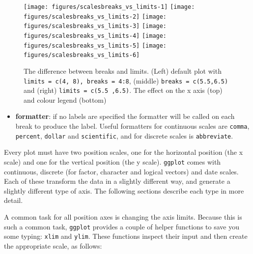 \begin{figure}

{\centering \texttt{[image: figures/scalesbreaks\_vs\_limits-1]} \texttt{[image: figures/scalesbreaks\_vs\_limits-2]} \texttt{[image: figures/scalesbreaks\_vs\_limits-3]} \texttt{[image: figures/scalesbreaks\_vs\_limits-4]} \texttt{[image: figures/scalesbreaks\_vs\_limits-5]} \texttt{[image: figures/scalesbreaks\_vs\_limits-6]} 

}

\caption{The difference between breaks and limits. (Left) default plot with \texttt{limits = c(4, 8), breaks = 4:8}, (middle) \texttt{breaks = c(5.5,6.5)} and (right) \texttt{limits = c(5.5 ,6.5)}. The effect on the x axis (top) and colour legend (bottom)\label{fig:breaks_vs_limits}}
\end{figure}

\begin{itemize}
\itemsep1pt\parskip0pt
\item
  \textbf{formatter}: if no labels are specified the formatter will be
  called on each break to produce the label. Useful formatters for
  continuous scales are \texttt{comma}, \texttt{percent},
  \texttt{dollar} and \texttt{scientific}, and for discrete scales is
  \texttt{abbreviate}. 
\end{itemize}


Every plot must have two position scales, one for the horizontal
position (the x scale) and one for the vertical position (the y scale).
\texttt{ggplot} comes with continuous, discrete (for factor, character
and logical vectors) and date scales. Each of these transform the data
in a slightly different way, and generate a slightly different type of
axis. The following sections describe each type in more detail.
 

A common task for all position axes is changing the axis limits. Because
this is such a common task, \texttt{ggplot} provides a couple of helper
functions to save you some typing: \texttt{xlim} and \texttt{ylim}.
These functions inspect their input and then create the appropriate
scale, as follows:  
  

